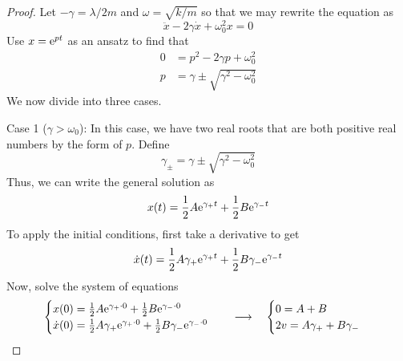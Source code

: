 \documentclass[../psets.tex]{subfiles}
\begin{document}
\begin{enumerate}
\begin{enumerate}
\begin{proof}


            Let $-\gamma=\lambda/2m$ and $\omega=\sqrt{k/m}$ so that we may rewrite the equation as
            \begin{equation*}
                \ddot{x}-2\gamma\dot{x}+\omega_0^2x = 0
            \end{equation*}
            Use $x=\e[pt]$ as an ansatz to find that
            \begin{align*}
                0 &= p^2-2\gamma p+\omega_0^2\\
                p &= \gamma\pm\sqrt{\gamma^2-\omega_0^2}
            \end{align*}
            We now divide into three cases.\par
            Case 1 ($\gamma>\omega_0$): In this case, we have two real roots that are both positive real numbers by the form of $p$. Define
            \begin{equation*}
                \gamma_\pm = \gamma\pm\sqrt{\gamma^2-\omega_0^2}
            \end{equation*}
            Thus, we can write the general solution as
            \begin{equation*}
                x(t) = \frac{1}{2}A\e[\gamma_+t]+\frac{1}{2}B\e[\gamma_-t]
            \end{equation*}
            To apply the initial conditions, first take a derivative to get
            \begin{equation*}
                \dot{x}(t) = \frac{1}{2}A\gamma_+\e[\gamma_+t]+\frac{1}{2}B\gamma_-\e[\gamma_-t]
            \end{equation*}
            Now, solve the system of equations
            \begin{equation*}
                \begin{cases}
                    x(0) = \frac{1}{2}A\e[\gamma_+\cdot 0]+\frac{1}{2}B\e[\gamma_-\cdot 0]\\
                    \dot{x}(0) = \frac{1}{2}A\gamma_+\e[\gamma_+\cdot 0]+\frac{1}{2}B\gamma_-\e[\gamma_-\cdot 0]
                \end{cases}
                \quad\longrightarrow\quad
                \begin{cases}
                    0 = A+B\\
                    2v = A\gamma_++B\gamma_-
                \end{cases}
            \end{equation*}

\end{proof}
\end{enumerate}
\end{enumerate}
\end{document}
